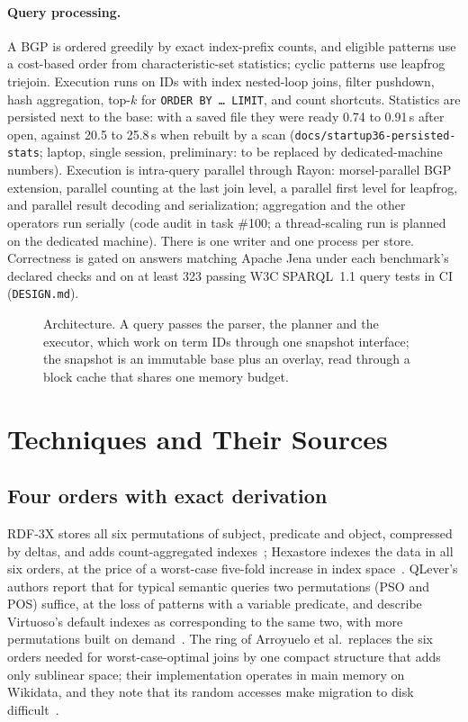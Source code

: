 \documentclass[sigconf, nonacm]{acmart}
\begin{document}
\paragraph{Query processing.} A BGP is ordered greedily by exact index-prefix counts, and eligible patterns use a cost-based order from characteristic-set statistics; cyclic patterns use leapfrog triejoin.
Execution runs on IDs with index nested-loop joins, filter pushdown, hash aggregation, top-$k$ for \texttt{ORDER BY \dots\ LIMIT}, and count shortcuts. Statistics are persisted next to the base:
with a saved file they were ready 0.74 to 0.91\,s after open, against 20.5 to 25.8\,s when rebuilt by a scan (\texttt{docs/startup36-persisted-stats}; laptop, single session, preliminary: to be replaced by dedicated-machine numbers).
Execution is intra-query parallel through Rayon: morsel-parallel BGP extension, parallel counting at the last join level, a parallel first level for leapfrog, and parallel result decoding and serialization; aggregation and the other operators run serially (code audit in task \#100; a thread-scaling run is planned on the dedicated machine). There is one writer and one process per store.
Correctness is gated on answers matching Apache Jena under each benchmark's declared checks and on at least 323 passing W3C SPARQL~1.1 query tests in CI (\texttt{DESIGN.md}).

\begin{figure}[t]
\centering
\resizebox{0.8\textwidth}{!}{}
\caption{Architecture. A query passes the parser, the planner and the executor, which work on term IDs through one snapshot interface; the snapshot is an immutable base plus an overlay, read through a block cache that shares one memory budget.}
\label{fig:arch}
\end{figure}

\section{Techniques and Their Sources}
\subsection{Four orders with exact derivation}
RDF-3X stores all six permutations of subject, predicate and object, compressed by deltas, and adds count-aggregated indexes~\cite{neumann2008}; Hexastore indexes the data in all six orders, at the price of a worst-case five-fold increase in index space~\cite{weiss2008}.
QLever's authors report that for typical semantic queries two permutations (PSO and POS) suffice, at the loss of patterns with a variable predicate, and describe Virtuoso's default indexes as corresponding to the same two, with more permutations built on demand~\cite{bast2017}.
The ring of Arroyuelo et al.\ replaces the six orders needed for worst-case-optimal joins by one compact structure that adds only sublinear space; their implementation operates in main memory on Wikidata, and they note that its random accesses make migration to disk difficult~\cite{arroyuelo2021}.
\end{document}
